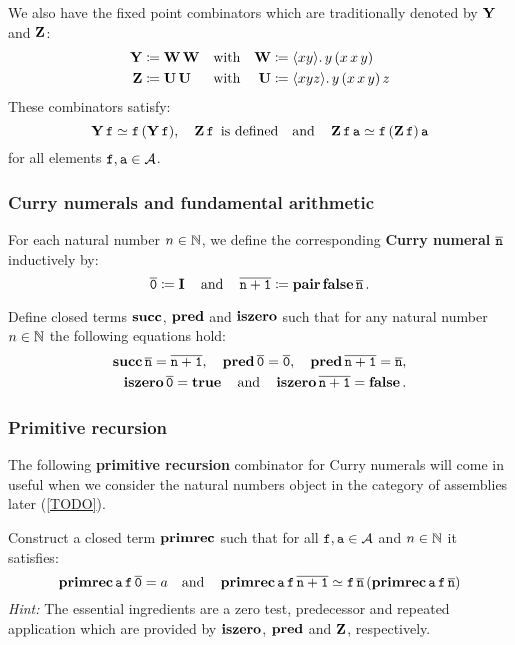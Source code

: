 We also have the fixed point combinators which are traditionally denoted by
\(\pcay\) and \(\pcaz\):
\begin{align*}
  \pcay &\coloneqq \pcaw\pcaw &\text{with}&& \pcaw &\coloneq \lambdapca{xy}{y\,(x\,x\,y)} \\
  \pcaz &\coloneqq \pcau\pcau &\text{with}&& \pcau &\coloneq \lambdapca{xyz}{y\,(x\,x\,y)\,z}
\end{align*}
These combinators satisfy:
\[
  \pcay\pca{f} \simeq \pca{f}{(\pcay\pca{f})},
    \quad
  \pcaz\pca{f} \text { is defined}
    \quad\text{and}\quad
  \pcaz\pca{f}\pca{a} \simeq \pca{f}{(\pcaz\pca{f})}\pca{a}
\]
for all elements \(\pca{f},\pca{a} \in \AA\).

\subsubsection*{Curry numerals and fundamental arithmetic}\label{sec:numerals}

For each natural number \(n \in \Nat\), we define the corresponding
\textbf{Curry numeral} \(\numeral{n}\) inductively by:
\[
  \numeral{0} \coloneq \icomb
  \quad\text{and}\quad
  \numeral{n+1} \coloneq \pcapair\pcafalse\numeral{n}.
\]

\begin{exercise}\label{exer:arithmetic}
  Define closed terms \(\pcasucc\), \(\pcapred\) and \(\pcaiszero\) such that
  for any natural number \(n \in \Nat\) the following equations hold:
  \begin{align*}
    \pcasucc\numeral{n} = \numeral{n+1},
    \quad
    \pcapred\numeral{0} = \numeral{0},
    \quad
    \pcapred\numeral{n+1} = \numeral{n}, \\
    \pcaiszero\numeral{0} = \pcatrue
    \quad\text{and}\quad
    \pcaiszero\numeral{n+1} = \pcafalse.
  \end{align*}

\end{exercise}

\subsubsection*{Primitive recursion}

The following \textbf{primitive recursion} combinator for Curry numerals will
come in useful when we consider the natural numbers object in the category of
assemblies later (\cref{TODO}).

\begin{exercise}\label{exer:primitive-recursion}
  Construct a closed term \(\pcarec\) such that for all
  \(\pca{f},\pca{a} \in \AA\) and \(n \in \Nat\) it satisfies:
  \[
    \pcarec\pca{a}\pca{f}\numeral{0} = a
    \quad\text{and}\quad
    \pcarec\pca{a}\pca{f}\numeral{n+1} \simeq \pca{f}\numeral{n}{(\pcarec\pca{a}\pca{f}\numeral{n})}
  \]
  \emph{Hint:} The essential ingredients are a zero test, predecessor and
  repeated application which are provided by \(\pcaiszero\), \(\pcapred\) and
  \(\pcaz\), respectively.
\end{exercise}

